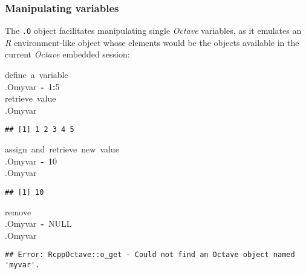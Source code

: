 \documentclass[english,10pt,a4paper]{article}\usepackage{graphicx, color}
\makeatletter
\newcommand{\hlnumber}[1]{\textcolor[rgb]{0,0,0}{#1}}%
\newcommand{\hlkeyword}[1]{\textcolor[rgb]{0,0,0}{\textbf{#1}}}%
\newcommand{\hlcomment}[1]{\textcolor[rgb]{0.180392156862745,0.6,0.341176470588235}{#1}}%
\newcommand{\hlassignement}[1]{\textcolor[rgb]{0,0,0}{\textbf{#1}}}%
\newcommand{\hlsymbol}[1]{\textcolor[rgb]{0,0,0}{#1}}%
\newcommand{\hlstd}[1]{\textcolor[rgb]{0,0,0}{#1}}%
\newenvironment{kframe}{%
 \def\FrameCommand##1{\hskip\@totalleftmargin \hskip-\fboxsep
 \colorbox{shadecolor}{##1}\hskip-\fboxsep
     \hskip-\linewidth \hskip-\@totalleftmargin \hskip\columnwidth}%
 \MakeFramed {\advance\hsize-\width
   \@totalleftmargin\z@ \linewidth\hsize
   \@setminipage}}%
 {\par\unskip\endMakeFramed}
\newenvironment{knitrout}{}{} %
\let\proglang=\textit
\let\code=\texttt
\newcommand{\octave}{\proglang{Octave}\xspace}
\makeatother
\begin{document}
\subsubsection{Manipulating variables}
The \code{.O} object facilitates manipulating single \octave
variables, as it emulates an \proglang{R} environment-like object whose elements
would be the objects available in the current \octave
embedded session:

\begin{knitrout}
\color{fgcolor}\begin{kframe}
\begin{flushleft}
\ttfamily\noindent
\hlcomment{\usebox{\hlnormalsizeboxhash}{\ }define{\ }a{\ }variable}\hspace*{\fill}\\
\hlstd{}\hlsymbol{.O}\hlkeyword{\usebox{\hlnormalsizeboxdollar}}\hlsymbol{myvar}{\ }\hlassignement{\usebox{\hlnormalsizeboxlessthan}-}{\ }\hlnumber{1}\hlkeyword{:}\hlnumber{5}\hspace*{\fill}\\
\hlstd{}\hlcomment{\usebox{\hlnormalsizeboxhash}{\ }retrieve{\ }value}\hspace*{\fill}\\
\hlstd{}\hlsymbol{.O}\hlkeyword{\usebox{\hlnormalsizeboxdollar}}\hlsymbol{myvar}\mbox{}
\normalfont
\end{flushleft}
\begin{verbatim}
## [1] 1 2 3 4 5
\end{verbatim}
\begin{flushleft}
\ttfamily\noindent
\hlcomment{\usebox{\hlnormalsizeboxhash}{\ }assign{\ }and{\ }retrieve{\ }new{\ }value}\hspace*{\fill}\\
\hlstd{}\hlsymbol{.O}\hlkeyword{\usebox{\hlnormalsizeboxdollar}}\hlsymbol{myvar}{\ }\hlassignement{\usebox{\hlnormalsizeboxlessthan}-}{\ }\hlnumber{10}\hspace*{\fill}\\
\hlstd{}\hlsymbol{.O}\hlkeyword{\usebox{\hlnormalsizeboxdollar}}\hlsymbol{myvar}\mbox{}
\normalfont
\end{flushleft}
\begin{verbatim}
## [1] 10
\end{verbatim}
\begin{flushleft}
\ttfamily\noindent
\hlcomment{\usebox{\hlnormalsizeboxhash}{\ }remove}\hspace*{\fill}\\
\hlstd{}\hlsymbol{.O}\hlkeyword{\usebox{\hlnormalsizeboxdollar}}\hlsymbol{myvar}{\ }\hlassignement{\usebox{\hlnormalsizeboxlessthan}-}{\ }NULL\hspace*{\fill}\\
\hlstd{}\hlsymbol{.O}\hlkeyword{\usebox{\hlnormalsizeboxdollar}}\hlsymbol{myvar}\mbox{}
\normalfont
\end{flushleft}
\begin{verbatim}
## Error: RcppOctave::o_get - Could not find an Octave object named 'myvar'.
\end{verbatim}
\end{kframe}
\end{knitrout}
\end{document}
